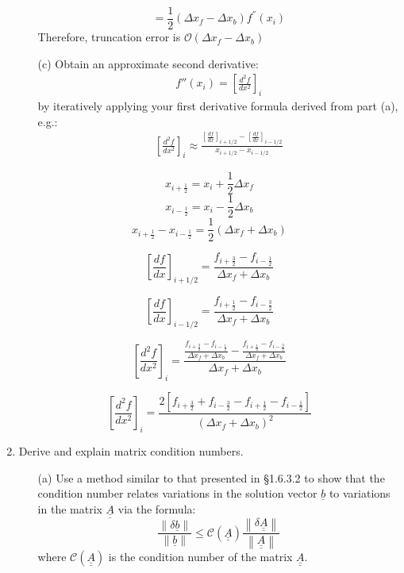 \documentclass{article}
\begin{document}
\begin{enumerate}
\begin{itemize}
    $$ = \frac{1}{2} (\Delta x_f - \Delta x_b)f^{''} (x_i)$$
    Therefore, truncation error is $\boxed{\mathcal{O}(\Delta x_f - \Delta x_b)}$
    
    \pagebreak
    
    \item[(c)]  Obtain an approximate second derivative:
      \begin{eqnarray}
        f''(x_i) = \left[ \frac{d^2 f}{d x^2} \right]_i
      \end{eqnarray}        
      by iteratively applying your first derivative formula derived from part (a), e.g.:
      \begin{eqnarray}
        \left[ \frac{d^2 f}{d x^2} \right]_i \approx 
        \frac{
        \left[ \frac{d f}{d x} \right]_{i+1/2} - \left[ \frac{d f}{d x} \right]_{i-1/2}
        }{x_{i+1/2}-x_{i-1/2}}
      \end{eqnarray} 
    \end{itemize}
    
    $$x_{i+\frac{1}{2}} = x_i + \frac{1}{2} \Delta x_f$$  $$x_{i-\frac{1}{2}} = x_i - \frac{1}{2} \Delta x_b$$
    $$x_{i+\frac{1}{2}} - x_{i-\frac{1}{2}} = \frac{1}{2} (\Delta x_f + \Delta x_b)$$
    
    \bigskip
    
    $$\left[ \frac{d f}{d x} \right]_{i+1/2} = \frac{\displaystyle f_{i + \frac{3}{2}} - f_{i - \frac{1}{2}}}{\displaystyle \Delta x_f + \Delta x_b}$$
    
    $$\left[ \frac{d f}{d x} \right]_{i-1/2} = \frac{\displaystyle f_{i + \frac{1}{2}} - f_{i - \frac{3}{2}}}{\displaystyle \Delta x_f + \Delta x_b}$$
    
    $$\left[ \frac{d^{2} f}{d x^{2}} \right]_{i} = \frac{
    \frac{\displaystyle f_{i + \frac{3}{2}} - f_{i - \frac{1}{2}}}{\displaystyle \Delta x_f + \Delta x_b} - \frac{\displaystyle f_{i + \frac{1}{2}} - f_{i - \frac{3}{2}}}{\displaystyle \Delta x_f + \Delta x_b}}
	{\Delta x_f + \Delta x_b}$$
	
	$$\boxed{\left[ \frac{d^{2} f}{d x^{2}} \right]_{i} = \frac{2\left[ f_{i + \frac{3}{2}} + f_{i - \frac{3}{2}} - f_{i + \frac{1}{2}} - f_{i - \frac{1}{2}} \right]}{(\Delta x_f + \Delta x_b)^{2}}}$$
    
    \pagebreak
    
    \item  Derive and explain matrix condition numbers.  
    \begin{itemize}
      \item[(a)]Use a method similar to that presented in \S 1.6.3.2 to show that the condition number relates variations in the solution vector $\underline{b}$ to variations in the matrix $\underline{\underline{A}}$ via the formula:
      \begin{equation}
      \frac{\left\| \delta \underline{b} \right\|}{ \left\| \underline{b} \right\| } \le   \mathcal{C} (\underline{\underline{A}}) \frac{ \left\| \delta \underline{\underline{A}}   \right\| }{\left\| \underline{\underline{A}} \right\|}
      \end{equation}
      where $\mathcal{C} (\underline{\underline{A}})$ is the condition number of the matrix $\underline{\underline{A}}$.
      

\end{itemize}
\end{enumerate}
\end{document}
